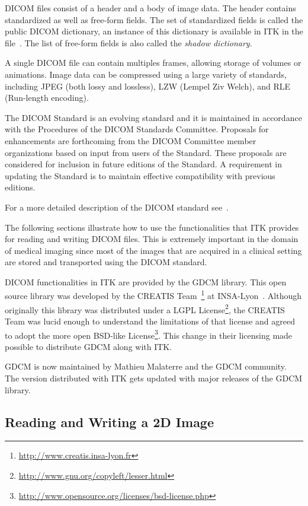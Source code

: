 DICOM files consist of a header and a body of image data. The header contains
standardized as well as free-form fields. The set of standardized fields is
called the public DICOM dictionary, an instance of this dictionary is available
in ITK in the file~.  The list of
free-form fields is also called the \emph{shadow dictionary}.

A single DICOM file can contain multiples frames, allowing storage of volumes
or animations. Image data can be compressed using a large variety of standards,
including JPEG (both lossy and lossless), LZW (Lempel Ziv Welch), and RLE
(Run-length encoding).

The DICOM Standard is an evolving standard and it is maintained in accordance
with the Procedures of the DICOM Standards Committee. Proposals for
enhancements are forthcoming from the DICOM Committee member organizations
based on input from users of the Standard. These proposals are considered for
inclusion in future editions of the Standard. A requirement in updating the
Standard is to maintain effective compatibility with previous editions.

For a more detailed description of the DICOM standard see~\cite{DICOMStandard}.

The following sections illustrate how to use the functionalities that ITK
provides for reading and writing DICOM files. This is extremely important in
the domain of medical imaging since most of the images that are acquired in a
clinical setting are stored and transported using the DICOM standard.

DICOM functionalities in ITK are provided by the GDCM library. This open source
library was developed by the CREATIS
Team~\footnote{\url{http://www.creatis.insa-lyon.fr}} at
INSA-Lyon~\cite{CreatisINSA-Lyon}.  Although originally this library was
distributed under a LGPL
License\footnote{\url{http://www.gnu.org/copyleft/lesser.html}}, the CREATIS Team was
lucid enough to understand the limitations of that license and agreed to adopt
the more open BSD-like
License\footnote{\url{http://www.opensource.org/licenses/bsd-license.php}}.
This change in their licensing made possible to distribute GDCM
along with ITK.

GDCM is now maintained by Mathieu Malaterre and the GDCM community.
The version distributed with ITK gets updated with major releases of the GDCM
library.

\subsection{Reading and Writing a 2D Image}
\label{DicomImageReadWrite}


